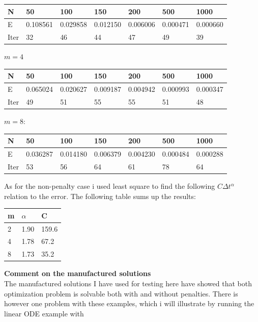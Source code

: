 \documentclass[11pt,a4paper]{article}
\begin{document}
\begin{center}
    \begin{tabular}{| l | l | l | l | l | l | l |}
    \hline
    N & 50 & 100  & 150 & 200 & 500 & 1000 \\ \hline
    E & 0.108561 & 0.029858 &0.012150 & 0.006006 & 0.000471 & 0.000660	\\ \hline
    Iter & 32 & 46  & 44 & 47 & 49 & 39 \\ \hline
    \end{tabular}
\end{center}
$m=4$
\begin{center}
    \begin{tabular}{| l | l | l | l | l | l | l |}
    \hline
    N & 50 & 100  & 150 & 200 & 500 & 1000 \\ \hline
    E & 0.065024 & 0.020627& 0.009187& 0.004942 & 0.000993 & 0.000347\\ \hline
    Iter & 49 & 51  & 55 & 55 & 51 & 48 \\ \hline
    \end{tabular}
\end{center}
$m=8$:
\begin{center}
    \begin{tabular}{| l | l | l | l | l | l | l |}
    \hline
    N & 50 & 100  & 150 & 200 & 500 & 1000 \\ \hline
    E & 0.036287 & 0.014180 &0.006379 & 0.004230 & 0.000484 & 0.000288	\\ \hline
    Iter & 53 & 56  & 64 & 61 & 78 & 64 \\ \hline
    \end{tabular}
\end{center}
As for the non-penalty case i used least square to find the following $C\Delta t^{\alpha}$ relation to the error. The following table sums up the results:
\begin{center}
    \begin{tabular}{| l | l | l |}
    \hline
    m & $\alpha$ & C \\ \hline
    2 & 1.90& 159.6\\ \hline
    4 & 1.78& 67.2\\ \hline
    8 & 1.73&35.2 \\ \hline
    \end{tabular}
\end{center}
\textbf{Comment on the manufactured solutions}
\\
The manufactured solutions I have used for testing here have showed that both optimization problem is solvable both with and without penalties. There is however one problem with these examples, which i will illustrate by running the linear ODE example with 
\end{document}
